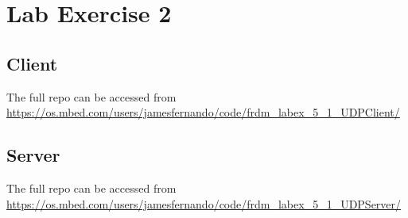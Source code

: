 \begin{appendices}
	\label{Appendix:start}
	\section{Lab Exercise 2}
	{
		\subsection{Client}
		{
			\label{appendix:ex2-Client}
			The full repo can be accessed from \url{https://os.mbed.com/users/jamesfernando/code/frdm_labex_5_1_UDPClient/}
			
		}
		\subsection{Server}
		{
			\label{appendix:ex2-Server}
			The full repo can be accessed from \url{https://os.mbed.com/users/jamesfernando/code/frdm_labex_5_1_UDPServer/}
			

		}
	}


\end{appendices}